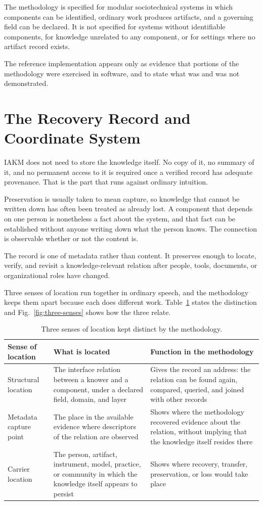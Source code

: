 \documentclass[conference]{IEEEtran}
\begin{document}
The methodology is specified for modular sociotechnical systems in which components can be identified, ordinary work produces artifacts, and a governing field can be declared. It is not specified for systems without identifiable components, for knowledge unrelated to any component, or for settings where no artifact record exists.

The reference implementation appears only as evidence that portions of the methodology were exercised in software, and to state what was and was not demonstrated.

\section{The Recovery Record and Coordinate System}\label{sec:5}

IAKM does not need to store the knowledge itself. No copy of it, no summary of it, and no permanent access to it is required once a verified record has adequate provenance. That is the part that runs against ordinary intuition.

Preservation is usually taken to mean capture, so knowledge that cannot be written down has often been treated as already lost. A component that depends on one person is nonetheless a fact about the system, and that fact can be established without anyone writing down what the person knows. The connection is observable whether or not the content is.

The record is one of metadata rather than content. It preserves enough to locate, verify, and revisit a knowledge-relevant relation after people, tools, documents, or organizational roles have changed.

Three senses of location run together in ordinary speech, and the methodology keeps them apart because each does different work. Table~\ref{tab:senses} states the distinction and Fig.~\ref{fig:three-senses} shows how the three relate.

\begin{table}[!tb]
\caption{Three senses of location kept distinct by the methodology.}
\label{tab:senses}
\centering
\scriptsize
\begin{tabularx}{\textwidth}{XXX}
\hline
\textbf{Sense of location} & \textbf{What is located} & \textbf{Function in the methodology} \\
\hline
Structural location & The interface relation between a knower and a component, under a declared field, domain, and layer & Gives the record an address: the relation can be found again, compared, queried, and joined with other records \\
Metadata capture point & The place in the available evidence where descriptors of the relation are observed & Shows where the methodology recovered evidence about the relation, without implying that the knowledge itself resides there \\
Carrier location & The person, artifact, instrument, model, practice, or community in which the knowledge itself appears to persist & Shows where recovery, transfer, preservation, or loss would take place \\
\hline
\end{tabularx}
\end{table}
\end{document}
